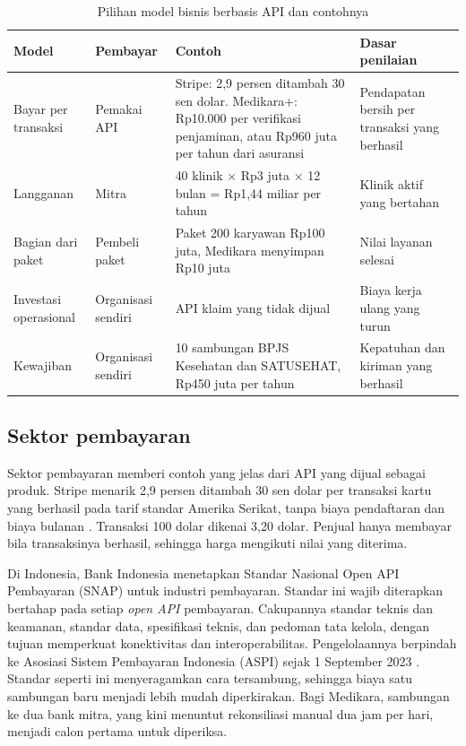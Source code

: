 \begin{table}[!htb]
  \centering
  \caption{Pilihan model bisnis berbasis API dan contohnya}
  \label{tab:ch04-model-bisnis}
  \small
  \begin{tabularx}{\textwidth}{K{2.3cm}K{2.0cm}JJ}
    \hline
    \textbf{Model} & \textbf{Pembayar} & \textbf{Contoh} & \textbf{Dasar penilaian} \\ \hline
    Bayar per transaksi & Pemakai API & Stripe: 2,9 persen ditambah 30 sen dolar. Medikara+: Rp10.000 per verifikasi penjaminan, atau Rp960 juta per tahun dari asuransi & Pendapatan bersih per transaksi yang berhasil \\ \hline
    Langganan & Mitra & 40 klinik $\times$ Rp3 juta $\times$ 12 bulan = Rp1,44 miliar per tahun & Klinik aktif yang bertahan \\ \hline
    Bagian dari paket & Pembeli paket & Paket 200 karyawan Rp100 juta, Medikara menyimpan Rp10 juta & Nilai layanan selesai \\ \hline
    Investasi operasional & Organisasi sendiri & API klaim yang tidak dijual & Biaya kerja ulang yang turun \\ \hline
    Kewajiban & Organisasi sendiri & 10 sambungan BPJS Kesehatan dan SATUSEHAT, Rp450 juta per tahun & Kepatuhan dan kiriman yang berhasil \\ \hline
  \end{tabularx}
\end{table}

\subsection*{Sektor pembayaran}

Sektor pembayaran memberi contoh yang jelas dari API yang dijual sebagai produk. Stripe menarik 2,9 persen
ditambah 30 sen dolar per transaksi kartu yang berhasil pada tarif standar Amerika Serikat, tanpa biaya
pendaftaran dan biaya bulanan \cite{stripe-pricing}. Transaksi 100 dolar dikenai 3,20 dolar. Penjual
hanya membayar bila transaksinya berhasil, sehingga harga mengikuti nilai yang diterima.

Di Indonesia, Bank Indonesia menetapkan Standar Nasional Open API Pembayaran (SNAP) untuk industri
pembayaran. Standar ini wajib diterapkan bertahap pada setiap \textit{open API} pembayaran. Cakupannya
standar teknis dan keamanan, standar data, spesifikasi teknis, dan pedoman tata kelola, dengan tujuan
memperkuat konektivitas dan interoperabilitas. Pengelolaannya berpindah ke Asosiasi Sistem Pembayaran
Indonesia (ASPI) sejak 1 September 2023 \cite{snap-bi}. Standar seperti ini menyeragamkan cara
tersambung, sehingga biaya satu sambungan baru menjadi lebih mudah diperkirakan. Bagi Medikara, sambungan ke dua
bank mitra, yang kini menuntut rekonsiliasi manual dua jam per hari, menjadi calon pertama untuk diperiksa.

